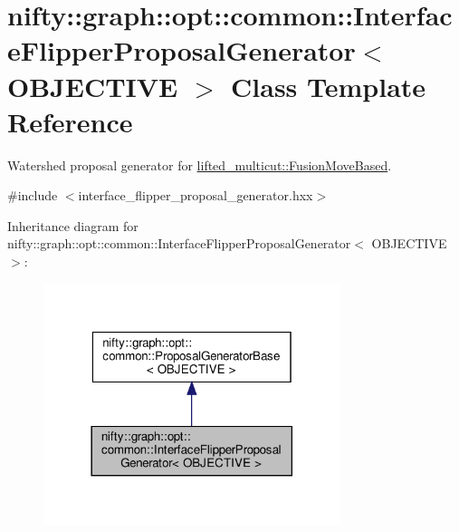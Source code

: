 \hypertarget{classnifty_1_1graph_1_1opt_1_1common_1_1InterfaceFlipperProposalGenerator}{}\section{nifty\+:\+:graph\+:\+:opt\+:\+:common\+:\+:Interface\+Flipper\+Proposal\+Generator$<$ O\+B\+J\+E\+C\+T\+I\+VE $>$ Class Template Reference}
\label{classnifty_1_1graph_1_1opt_1_1common_1_1InterfaceFlipperProposalGenerator}


Watershed proposal generator for \hyperlink{classnifty_1_1graph_1_1opt_1_1lifted__multicut_1_1FusionMoveBased}{lifted\+\_\+multicut\+::\+Fusion\+Move\+Based}.  




{\ttfamily \#include $<$interface\+\_\+flipper\+\_\+proposal\+\_\+generator.\+hxx$>$}



Inheritance diagram for nifty\+:\+:graph\+:\+:opt\+:\+:common\+:\+:Interface\+Flipper\+Proposal\+Generator$<$ O\+B\+J\+E\+C\+T\+I\+VE $>$\+:
\nopagebreak
\begin{figure}[H]
\begin{center}
\leavevmode
\includegraphics[width=246pt]{classnifty_1_1graph_1_1opt_1_1common_1_1InterfaceFlipperProposalGenerator__inherit__graph}
\end{center}
\end{figure}


